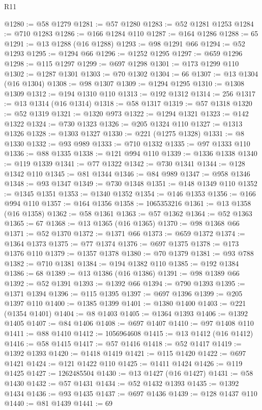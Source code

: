 \begin{lexlean}{R11}
\begin{coremodule}
@1280 := @58 @1279
@1281 := @57 @1280
@1283 := @52 @1281 @1253
@1284 := @710 @1283
@1286 := @166 @1284 @110
@1287 := @164 @1286
@1288 := 65
@1291 := @13 @1288 (@16 @1288)
@1293 := @98 @1291 @66
@1294 := @52 @1293
@1295 := @1294 @66
@1296 := @1252 @1295
@1297 := @659 @1296
@1298 := @115 @1297
@1299 := @697 @1298
@1301 := @173 @1299 @110
@1302 := @1287 @1301
@1303 := @70 @1302
@1304 := 66
@1307 := @13 @1304 (@16 @1304)
@1308 := @98 @1307
@1309 := @1294 @1295
@1310 := @1308 @1309
@1312 := @194 @1310 @110
@1313 := @192 @1312
@1314 := 256
@1317 := @13 @1314 (@16 @1314)
@1318 := @58 @1317
@1319 := @57 @1318
@1320 := @52 @1319
@1321 := @1320 @973
@1322 := @1294 @1321
@1323 := @142 @1322
@1324 := @730 @1323
@1326 := @205 @1324 @110
@1327 := @1313 @1326
@1328 := @1303 @1327
@1330 := @221 (@1275 @1328)
@1331 := @8 @1330
@1332 := @93 @989
@1333 := @710 @1332
@1335 := @97 @1333 @110
@1336 := @88 @1335
@1338 := @121 @994 @110
@1339 := @1336 @1338
@1340 := @119 @1339
@1341 := @77 @1322
@1342 := @730 @1341
@1344 := @128 @1342 @110
@1345 := @81 @1344
@1346 := @84 @989
@1347 := @958 @1346
@1348 := @93 @1347
@1349 := @730 @1348
@1351 := @148 @1349 @110
@1352 := @1345 @1351
@1353 := @1340 @1352
@1354 := @146 @1353
@1356 := @166 @994 @110
@1357 := @164 @1356
@1358 := 1065353216
@1361 := @13 @1358 (@16 @1358)
@1362 := @58 @1361
@1363 := @57 @1362
@1364 := @52 @1363
@1365 := 67
@1368 := @13 @1365 (@16 @1365)
@1370 := @98 @1368 @66
@1371 := @52 @1370
@1372 := @1371 @66
@1373 := @659 @1372
@1374 := @1364 @1373
@1375 := @77 @1374
@1376 := @697 @1375
@1378 := @173 @1376 @110
@1379 := @1357 @1378
@1380 := @70 @1379
@1381 := @93 @788
@1382 := @710 @1381
@1384 := @194 @1382 @110
@1385 := @192 @1384
@1386 := 68
@1389 := @13 @1386 (@16 @1386)
@1391 := @98 @1389 @66
@1392 := @52 @1391
@1393 := @1392 @66
@1394 := @790 @1393
@1395 := @1371 @1394
@1396 := @115 @1395
@1397 := @697 @1396
@1399 := @205 @1397 @110
@1400 := @1385 @1399
@1401 := @1380 @1400
@1403 := @221 (@1354 @1401)
@1404 := @8 @1403
@1405 := @1364 @1393
@1406 := @1392 @1405
@1407 := @84 @1406
@1408 := @697 @1407
@1410 := @97 @1408 @110
@1411 := @88 @1410
@1412 := 1056964608
@1415 := @13 @1412 (@16 @1412)
@1416 := @58 @1415
@1417 := @57 @1416
@1418 := @52 @1417
@1419 := @1392 @1393
@1420 := @1418 @1419
@1421 := @115 @1420
@1422 := @697 @1421
@1424 := @121 @1422 @110
@1425 := @1411 @1424
@1426 := @119 @1425
@1427 := 1262485504
@1430 := @13 @1427 (@16 @1427)
@1431 := @58 @1430
@1432 := @57 @1431
@1434 := @52 @1432 @1393
@1435 := @1392 @1434
@1436 := @93 @1435
@1437 := @697 @1436
@1439 := @128 @1437 @110
@1440 := @81 @1439
@1441 := 69

\end{coremodule}
\end{lexlean}
